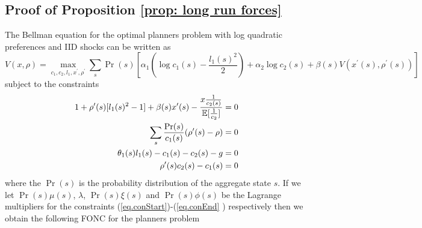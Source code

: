 \documentclass[thmsb,11pt]{article}
\begin{document}
\subsection{Proof of Proposition \protect\ref{prop: long run forces}}

The Bellman equation for the optimal planners problem with log quadratic
preferences and IID shocks can be written as
\begin{equation*}
V(x,\rho) = \max_{c_1,c_2,l_1,x^{\prime },\rho^{\prime }} \sum_s \Pr(s)\left[%
\alpha_1\left(\log c_1(s) -\frac{l_1(s)^2}{2}\right)+\alpha_2\log
c_2(s)+\beta(s) V(x^{\prime }(s),\rho^{\prime }(s))\right]
\end{equation*}%
subject to the constraints
\begin{align}
1+\rho^{\prime }(s)[l_1(s)^2-1]+\beta(s)x^{\prime }(s) - \frac{x\frac{1}{%
c_2(s)}}{\mathbb{E}[\frac1{c_2}]}=0  \label{eq.conStart} \\
\sum_s\frac{\Pr(s)}{c_1(s)}(\rho^{\prime }(s)-\rho) = 0 \\
\theta_1(s)l_1(s) -c_1(s)-c_2(s)-g = 0 \\
\rho^{\prime }(s) c_2(s)-c_1(s) = 0  \label{eq.conEnd}
\end{align}
where the $\Pr(s)$ is the probability distribution of the aggregate state $s$. If
we let $\Pr(s)\mu(s)$, $\lambda$, $\Pr(s)\xi(s)$ and $\Pr(s)\phi(s)$ be the
Lagrange multipliers for the constraints (\ref{eq.conStart})-(\ref{eq.conEnd}%
) respectively then we obtain the following FONC for the planners problem
\end{document}
